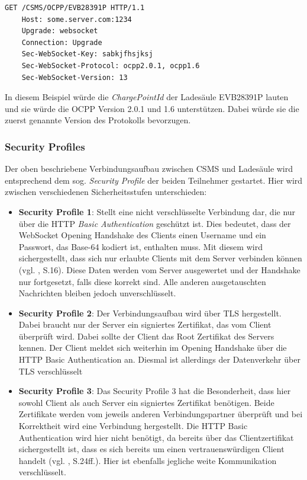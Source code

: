 \begin{lstlisting}[caption={OCPP Opening Handshake Aufbau \cite{Eigene_Darstellung}}, label=lst:opening_handshake, float]
	GET /CSMS/OCPP/EVB28391P HTTP/1.1
	Host: some.server.com:1234
	Upgrade: websocket
	Connection: Upgrade
	Sec-WebSocket-Key: sabkjfhsjksj
	Sec-WebSocket-Protocol: ocpp2.0.1, ocpp1.6
	Sec-WebSocket-Version: 13
\end{lstlisting}

\noindent In diesem Beispiel würde die \textit{ChargePointId} der Ladesäule \glqq{}EVB28391P\grqq{} lauten und sie würde die \acs{OCPP} Version 2.0.1 und 1.6 unterstützen. Dabei würde sie die zuerst genannte Version des Protokolls bevorzugen.

\label{Security_Profiles}
\subsubsection{Security Profiles}
Der oben beschriebene Verbindungsaufbau zwischen \acs{CSMS} und Ladesäule wird entsprechend dem sog. \textit{Security Profile} der beiden Teilnehmer gestartet. Hier wird zwischen verschiedenen Sicherheitsstufen unterschieden:
\begin{itemize}
	\item \textbf{Security Profile 1}: Stellt eine nicht verschlüsselte Verbindung dar, die nur über die \acs{HTTP} \textit{Basic Authentication} geschützt ist. Dies bedeutet, dass der WebSocket Opening Handshake des Clients einen Username und ein Passwort, das Base-64 kodiert ist, enthalten muss. Mit diesem wird sichergestellt, dass sich nur erlaubte Clients mit dem Server verbinden können (vgl. \cite{OCPP-j-1.6-specification}, S.16). Diese Daten werden vom Server ausgewertet und der Handshake nur fortgesetzt, falls diese korrekt sind. Alle anderen ausgetauschten Nachrichten bleiben jedoch unverschlüsselt.
	\item \textbf{Security Profile 2}:
	Der Verbindungsaufbau wird über TLS hergestellt. Dabei braucht nur der Server ein signiertes Zertifikat, das vom Client überprüft wird. Dabei sollte der Client das Root Zertifikat des Servers kennen. Der Client meldet sich weiterhin im Opening Handshake über die \acs{HTTP} Basic Authentication an. Diesmal ist allerdings der Datenverkehr über \acs{TLS} verschlüsselt
	\item \textbf{Security Profile 3}:
	Das Security Profile 3 hat die Besonderheit, dass hier sowohl Client als auch Server ein signiertes Zertifikat benötigen. Beide Zertifikate werden vom jeweils anderen Verbindungspartner überprüft und bei Korrektheit wird eine Verbindung hergestellt. Die \acs{HTTP} Basic Authentication wird hier nicht benötigt, da bereits über das Clientzertifikat sichergestellt ist, dass es sich bereits um einen vertrauenswürdigen Client handelt (vgl. \cite{OCPP-2.0.1-part2-specification-edition2}, S.24ff.). Hier ist ebenfalls jegliche weite Kommunikation verschlüsselt.
\end{itemize}
